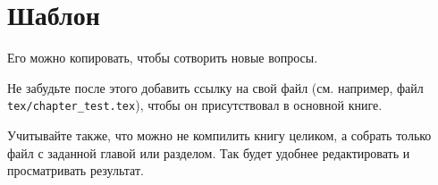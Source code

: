\documentclass[../main.tex]{subfiles}
\begin{document}
\chapter{Шаблон}

Его можно копировать, чтобы сотворить новые вопросы.

Не забудьте после этого добавить ссылку на свой файл
(см. например, файл \texttt{tex/chapter\_test.tex}), 
чтобы он присутствовал в основной книге.

Учитывайте также, что можно не компилить книгу целиком, а собрать только файл 
с заданной главой или разделом. Так будет удобнее редактировать 
и просматривать результат.
\end{document}
